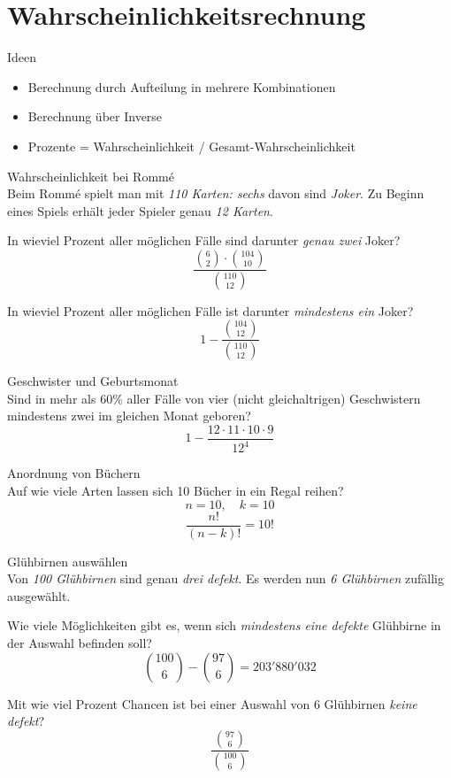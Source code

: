 \section{Wahrscheinlichkeitsrechnung}
\begin{concept}{Ideen}\\
\begin{itemize}
 \item Berechnung durch Aufteilung in mehrere Kombinationen
 \item Berechnung über Inverse
 \item Prozente = Wahrscheinlichkeit / Gesamt-Wahrscheinlichkeit
\end{itemize}
\end{concept}

\begin{example}{Wahrscheinlichkeit bei Rommé}\\
Beim Rommé spielt man mit \emph{110 Karten: sechs} davon sind \emph{Joker}. Zu Beginn eines Spiels erhält jeder Spieler genau \emph{12 Karten}.

In wieviel Prozent aller möglichen Fälle sind darunter \emph{genau zwei} Joker?
$$\frac{\binom{6}{2} \cdot \binom{104}{10}}{\binom{110}{12}}$$

In wieviel Prozent aller möglichen Fälle ist darunter \emph{mindestens ein} Joker?
$$1 - \frac{\binom{104}{12}}{\binom{110}{12}}$$
\end{example}

\begin{example}{Geschwister und Geburtsmonat}\\
Sind in mehr als 60\% aller Fälle von vier (nicht gleichaltrigen) Geschwistern mindestens zwei im gleichen Monat geboren?
$$1 - \frac{12 \cdot 11 \cdot 10 \cdot 9}{12^4}$$
\end{example}

\begin{example}{Anordnung von Büchern}\\
Auf wie viele Arten lassen sich 10 Bücher in ein Regal reihen?
$$n = 10, \quad k = 10$$
$$\frac{n!}{(n-k)!} = 10!$$
\end{example}

\begin{example}{Glühbirnen auswählen}\\
Von \emph{100 Glühbirnen} sind genau \emph{drei defekt}. Es werden nun \emph{6 Glühbirnen} zufällig ausgewählt.

Wie viele Möglichkeiten gibt es, wenn sich \emph{mindestens eine defekte} Glühbirne in der Auswahl befinden soll?
$$\binom{100}{6} - \binom{97}{6} = 203'880'032$$

Mit wie viel Prozent Chancen ist bei einer Auswahl von 6 Glühbirnen \emph{keine defekt}?
$$\frac{\binom{97}{6}}{\binom{100}{6}}$$
\end{example}

